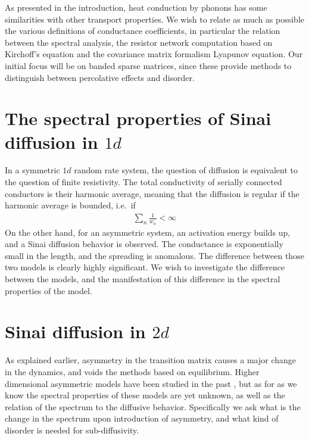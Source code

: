 As presented in the introduction, heat conduction by phonons has some
similarities with other transport properties. We wish to relate as much
as possible the various definitions of conductance coefficients, in 
particular the relation between the spectral analysis,
the resistor network computation based on Kirchoff's equation
and the covariance matrix formalism Lyapunov equation. Our initial focus
will be on banded sparse matrices, since these provide methods to distinguish
between percolative effects and disorder.


\section{The spectral properties of Sinai diffusion in $1d$}

In a symmetric $1d$ random rate system, the question of
diffusion is equivalent to the question of finite resistivity.
The total conductivity of serially connected conductors is their 
harmonic average, meaning that the diffusion is regular
if the harmonic average is bounded, i.e.\ if
%
\begin{align}
 \sum_n \frac{1}{w_n} < \infty 
\end{align}
%
On the other hand, for an asymmetric system, an activation energy 
builds up, and a Sinai diffusion behavior is observed.
The conductance is exponentially small in the length, and the spreading 
is anomalous. The difference between those two models is clearly highly 
significant. We wish to investigate the difference between the models,
and the manifestation of this difference in the spectral properties of the model.

\section{Sinai diffusion in $2d$}


As explained earlier, asymmetry in the transition matrix
causes a major change in the dynamics, and voids the methods based 
on equilibrium. Higher dimensional asymmetric models have been studied in the 
past %
, but as for as we know the spectral properties of these
models are yet unknown, as well as the relation of the spectrum to the 
diffusive behavior. Specifically we ask what is the change
in the spectrum upon introduction of asymmetry, and what kind 
of disorder is needed for sub-diffusivity.




